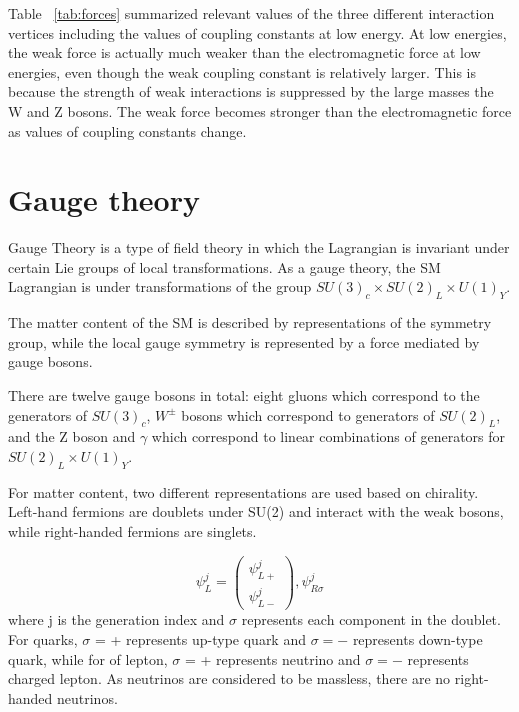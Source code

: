  Table ~\ref{tab:forces} summarized relevant values of the three different interaction vertices including the values of coupling constants at low energy. At low energies, the weak force is actually much weaker than the electromagnetic force at low energies, even though the weak coupling constant is relatively larger. This is because the strength of weak interactions is suppressed by the large masses the W and Z bosons. The weak force becomes stronger than the electromagnetic force as values of coupling constants change.


\section{Gauge theory}
Gauge Theory is a type of field theory in which the Lagrangian is invariant under certain Lie groups of local transformations. As a gauge theory, the SM Lagrangian is under transformations of the group $SU(3)_c \times SU(2)_L \times U(1)_Y$. 		 	 	 		

The matter content of the SM is described by representations of the symmetry group, while the local gauge symmetry is represented by a force mediated by gauge bosons. 

There are twelve gauge bosons in total: eight gluons which correspond to the generators of  $SU(3)_c$, $W^{\pm}$ bosons which correspond to generators of  $SU(2)_L$, and the Z boson and  $\gamma$ which correspond to linear combinations of generators for  $SU(2)_L \times U(1)_Y$.

For matter content, two different representations are used based on chirality.   Left-hand fermions are doublets under SU(2) and interact with the weak bosons,  while right-handed fermions are singlets.


  \begin{equation}
      \psi_L^{j}=\left( \begin{smallmatrix} \psi_{L+}^{j}\\ \psi_{L-}^{j} \end{smallmatrix}\right),  \psi_{R\sigma}^{j}
          \label{eq:fermion}
  \end{equation}
where j is the generation index and $\sigma$ represents each component in the doublet. 
For quarks, $\sigma$ = + represents up-type quark  and $\sigma = −$ represents down-type quark, while for of lepton, $\sigma$ = + represents neutrino and $\sigma = −$ represents charged lepton.
As neutrinos are considered to be massless, there are no right-handed neutrinos.	

